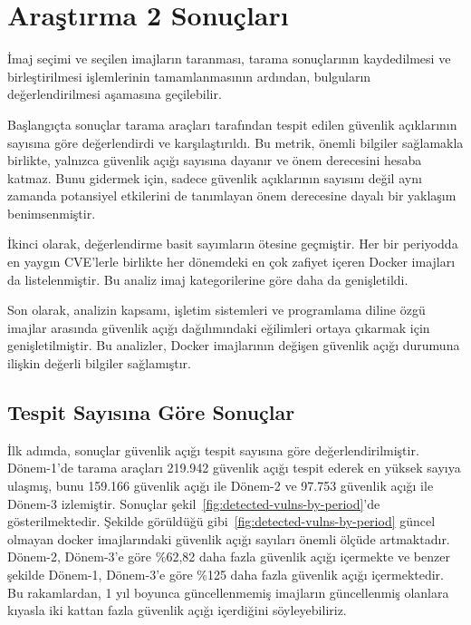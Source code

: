 \section{Araştırma 2 Sonuçları}\label{sec:results}

İmaj seçimi ve seçilen imajların taranması, tarama sonuçlarının kaydedilmesi ve birleştirilmesi işlemlerinin tamamlanmasının ardından, bulguların değerlendirilmesi aşamasına geçilebilir.

Başlangıçta sonuçlar tarama araçları tarafından tespit edilen güvenlik açıklarının sayısına göre değerlendirdi ve karşılaştırıldı. Bu metrik, önemli bilgiler sağlamakla birlikte, yalnızca güvenlik açığı sayısına dayanır ve önem derecesini hesaba katmaz. Bunu gidermek için, sadece güvenlik açıklarının sayısını değil aynı zamanda potansiyel etkilerini de tanımlayan önem derecesine dayalı bir yaklaşım benimsenmiştir.

İkinci olarak, değerlendirme basit sayımların ötesine geçmiştir. Her bir periyodda en yaygın CVE'lerle birlikte her dönemdeki en çok zafiyet içeren Docker imajları da listelenmiştir. Bu analiz imaj kategorilerine göre daha da genişletildi.

Son olarak, analizin kapsamı, işletim sistemleri ve programlama diline özgü imajlar arasında güvenlik açığı dağılımındaki eğilimleri ortaya çıkarmak için genişletilmiştir. Bu analizler, Docker imajlarının değişen güvenlik açığı durumuna ilişkin değerli bilgiler sağlamıştır.

\subsection{Tespit Sayısına Göre Sonuçlar}\label{subsec:results-by-detection-counts}

İlk adımda, sonuçlar güvenlik açığı tespit sayısına göre değerlendirilmiştir. Dönem-1'de tarama araçları 219.942 güvenlik açığı tespit ederek en yüksek sayıya ulaşmış, bunu 159.166 güvenlik açığı ile Dönem-2 ve 97.753 güvenlik açığı ile Dönem-3 izlemiştir. Sonuçlar şekil~\ref{fig:detected-vulns-by-period}'de gösterilmektedir. Şekilde görüldüğü gibi~\ref{fig:detected-vulns-by-period} güncel olmayan docker imajlarındaki güvenlik açığı sayıları önemli ölçüde artmaktadır. Dönem-2, Dönem-3'e göre \%62,82 daha fazla güvenlik açığı içermekte ve benzer şekilde Dönem-1, Dönem-3'e göre \%125 daha fazla güvenlik açığı içermektedir. Bu rakamlardan, 1 yıl boyunca güncellenmemiş imajların güncellenmiş olanlara kıyasla iki kattan fazla güvenlik açığı içerdiğini söyleyebiliriz.

